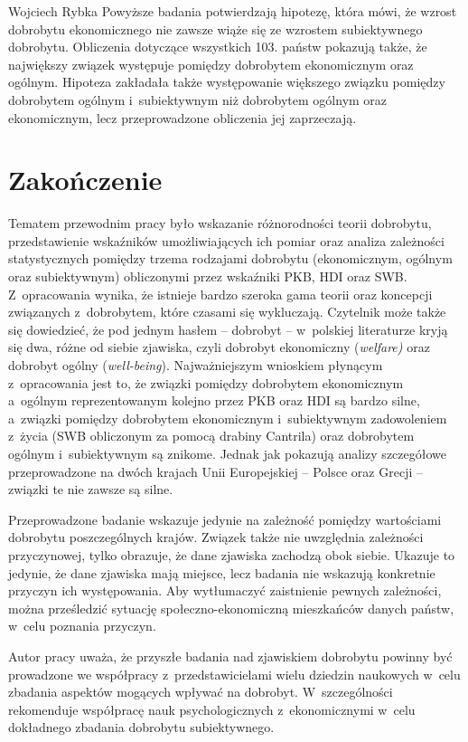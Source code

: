 \begin{artplenv}{Wojciech Rybka}
Powyższe badania potwierdzają hipotezę, która mówi, że wzrost dobrobytu ekonomicznego nie zawsze wiąże się
ze wzrostem subiektywnego dobrobytu. Obliczenia dotyczące wszystkich 103. państw pokazują także, że największy związek
występuje pomiędzy dobrobytem ekonomicznym oraz ogólnym. Hipoteza zakładała także występowanie większego związku
pomiędzy dobrobytem ogólnym i~subiektywnym niż dobrobytem ogólnym oraz ekonomicznym, lecz przeprowadzone obliczenia jej
zaprzeczają.

\section{Zakończenie}
Tematem przewodnim pracy było wskazanie różnorodności teorii dobrobytu, przedstawienie wskaźników
umożliwiających ich pomiar oraz analiza zależności statystycznych pomiędzy trzema rodzajami dobrobytu (ekonomicznym,
ogólnym oraz subiektywnym) obliczonymi przez wskaźniki PKB, HDI oraz SWB. Z~opracowania wynika, że istnieje bardzo
szeroka gama teorii oraz koncepcji związanych z~dobrobytem, które czasami się wykluczają. Czytelnik może także się
dowiedzieć, że pod jednym hasłem -- dobrobyt -- w~polskiej literaturze kryją się dwa, różne od siebie zjawiska, czyli
dobrobyt ekonomiczny (\textit{welfare)} oraz dobrobyt ogólny (\textit{well-being}). Najważniejszym wnioskiem
płynącym z~opracowania jest to, że związki pomiędzy dobrobytem ekonomicznym a~ogólnym reprezentowanym kolejno przez PKB
oraz HDI są bardzo silne, a~związki pomiędzy dobrobytem ekonomicznym i~subiektywnym zadowoleniem z~życia (SWB
obliczonym za pomocą drabiny Cantrila) oraz dobrobytem ogólnym i~subiektywnym są znikome. Jednak jak pokazują analizy
szczegółowe przeprowadzone na dwóch krajach Unii Europejskiej -- Polsce oraz Grecji -- związki te nie zawsze są silne. 

Przeprowadzone badanie wskazuje jedynie na zależność pomiędzy wartościami dobrobytu poszczególnych krajów.
Związek także nie uwzględnia zależności przyczynowej, tylko obrazuje, że dane zjawiska zachodzą obok
siebie. Ukazuje to jedynie, że dane zjawiska mają miejsce, lecz badania nie wskazują konkretnie przyczyn ich
występowania. Aby wytłumaczyć zaistnienie pewnych zależności, można prześledzić sytuację społeczno-ekonomiczną
mieszkańców danych państw, w~celu poznania przyczyn. 

Autor pracy uważa, że przyszłe badania nad zjawiskiem dobrobytu powinny być prowadzone we współpracy z~przedstawicielami
wielu dziedzin naukowych w~celu zbadania aspektów mogących wpływać na dobrobyt. W~szczególności rekomenduje współpracę
nauk psychologicznych z~ekonomicznymi w~celu dokładnego zbadania dobrobytu subiektywnego.

\end{artplenv}\label{rybka-stop}

